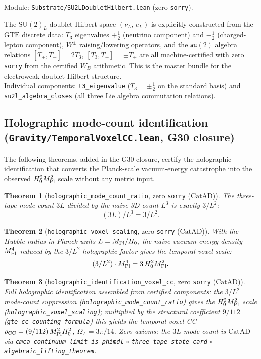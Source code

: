 \documentclass[11pt,a4paper]{article}
\newenvironment{keybox}[1]{%
  \Needspace*{8\baselineskip}%
  \begin{tcolorbox}[
    enhanced,
    breakable=false,
    colback=blue!5,
    colframe=blue!45!black,
    coltitle=black,
    colbacktitle=blue!14,
    boxrule=0.85pt,
    arc=2.5pt,
    left=9pt, right=9pt, top=6pt, bottom=6pt,
    titlerule=0.55pt,
    fonttitle=\bfseries,
    title={#1},
    before upper=\raggedright,
    before skip=0.9\baselineskip,
    after skip=0.9\baselineskip
  ]%
}{%
  \end{tcolorbox}%
}
\newtheorem{theorem}{Theorem}[section]
\theoremstyle{definition}
\newcommand{\CatAD}{\ensuremath{\mathrm{CatAD}}}
\newcommand{\GTE}{\ensuremath{\mathrm{GTE}}}
\begin{document}
Module: \texttt{Substrate/SU2LDoubletHilbert.lean} (zero \lstinline|sorry|).

\begin{keybox}{\lstinline|su2l_doublet_hilbert_certified| (zero \texttt{sorry})}
The $\mathrm{SU}(2)_L$ doublet Hilbert space $(\nu_L,\,e_L)$ is explicitly
constructed from the \GTE{} discrete data: $T_3$ eigenvalues $+\tfrac{1}{2}$
(neutrino component) and $-\tfrac{1}{2}$ (charged-lepton component), $W^\pm$
raising/lowering operators, and the $\mathfrak{su}(2)$ algebra relations
$[T_+,T_-]=2T_3$, $[T_3,T_\pm]=\pm T_\pm$ are all machine-certified with
zero \lstinline|sorry| from the certified $W_B$ arithmetic.
This is the master bundle for the electroweak doublet Hilbert structure.\\
Individual components: \lstinline|t3_eigenvalue| ($T_3 = \pm\tfrac{1}{2}$ on the
standard basis) and \lstinline|su2l_algebra_closes| (all three Lie algebra
commutation relations).
\end{keybox}

\subsection{Holographic mode-count identification (\texttt{Gravity/TemporalVoxelCC.lean}, G30 closure)}\label{subsec:holographic-mode-count}

The following theorems, added in the G30 closure, certify the holographic
identification that converts the Planck-scale vacuum-energy catastrophe into the
observed $H_0^2 M_{\rm Pl}^2$ scale without any metric input.

\begin{theorem}[\lstinline|holographic_mode_count_ratio|, zero \texttt{sorry} ($\CatAD$)]
The three-tape mode count $3L$ divided by the naive 3D count $L^3$ is exactly $3/L^2$:
\[ (3L)/L^3 = 3/L^2. \]
\end{theorem}

\begin{theorem}[\lstinline|holographic_voxel_scaling|, zero \texttt{sorry} ($\CatAD$)]
With the Hubble radius in Planck units $L = M_{\rm Pl}/H_0$, the naive
vacuum-energy density $M_{\rm Pl}^4$ reduced by the $3/L^2$ holographic factor
gives the temporal voxel scale:
\[ (3/L^2) \cdot M_{\rm Pl}^4 = 3\,H_0^2 M_{\rm Pl}^2. \]
\end{theorem}

\begin{theorem}[\lstinline|holographic_identification_voxel_cc|, zero \texttt{sorry} ($\CatAD$)]
Full holographic identification assembled from certified components: the
$3/L^2$ mode-count suppression (\lstinline|holographic_mode_count_ratio|) gives the
$H_0^2 M_{\rm Pl}^2$ scale (\lstinline|holographic_voxel_scaling|); multiplied by the
structural coefficient $9/112$ (\lstinline|gte_cc_counting_formula|) this yields the
temporal voxel CC $\rho_{\rm CC} = (9/112)\,M_{\rm Pl}^2 H_0^2$,
$\Omega_\Lambda = 3\pi/14$.  Zero axioms; the $3L$ mode count is $\CatAD$ via
\lstinline|cmca_continuum_limit_is_phimdl| $\circ$ \lstinline|three_tape_state_card| $\circ$
\lstinline|algebraic_lifting_theorem|.
\end{theorem}
\end{document}
